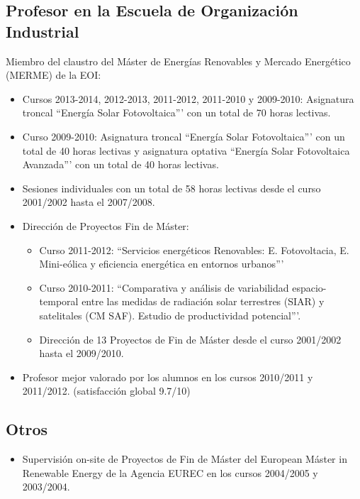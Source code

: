 \documentclass[article, a4paper]{memoir}
\begin{document}
\subsection{Profesor en la Escuela de Organización Industrial}
\label{sec-3-2}

Miembro del claustro del Máster de Energías Renovables y Mercado Energético (MERME) de la EOI:

\begin{itemize}
\item Cursos 2013-2014, 2012-2013, 2011-2012, 2011-2010 y 2009-2010:
Asignatura troncal ``Energía Solar Fotovoltaica''' con un total de 70
horas lectivas.

\item Curso 2009-2010: Asignatura troncal ``Energía Solar Fotovoltaica'''
con un total de 40 horas lectivas y asignatura optativa ``Energía
Solar Fotovoltaica Avanzada''' con un total de 40 horas lectivas.

\item Sesiones individuales con un total de 58 horas lectivas desde el
curso 2001/2002 hasta el 2007/2008.

\item Dirección de Proyectos Fin de Máster:

\begin{itemize}
\item Curso 2011-2012: ``Servicios energéticos Renovables:
E. Fotovoltacia, E. Mini-eólica y eficiencia energética en
entornos urbanos'''
\item Curso 2010-2011: ``Comparativa y análisis de variabilidad
espacio-temporal entre las medidas de radiación solar terrestres
(SIAR) y satelitales (CM SAF). Estudio de productividad
potencial'''.
\item Dirección de 13 Proyectos de Fin de Máster desde el curso
2001/2002 hasta el 2009/2010.
\end{itemize}

\item Profesor mejor valorado por los alumnos en los cursos 2010/2011
y 2011/2012. (satisfacción global 9.7/10)
\end{itemize}


\subsection{Otros}
\label{sec-3-3}

\begin{itemize}
\item Supervisión on-site de Proyectos de Fin de Máster del European
Máster in Renewable Energy de la Agencia EUREC en los cursos
2004/2005 y 2003/2004.
\end{itemize}
\end{document}
